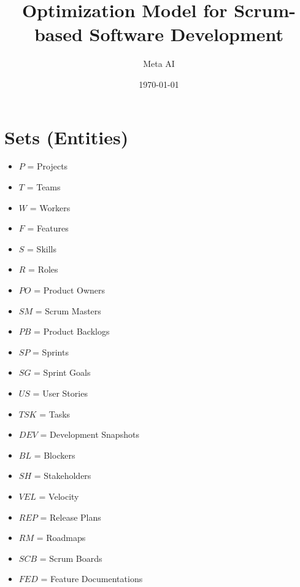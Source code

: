 \documentclass{article}
\title{Optimization Model for Scrum-based Software Development}
\author{Meta AI}
\date{\today}
\begin{document}
\maketitle
\tableofcontents

\section{Sets (Entities)}
\begin{itemize}
    \item $P$ = Projects
    \item $T$ = Teams
    \item $W$ = Workers
    \item $F$ = Features
    \item $S$ = Skills
    \item $R$ = Roles
    \item $PO$ = Product Owners
    \item $SM$ = Scrum Masters
    \item $PB$ = Product Backlogs
    \item $SP$ = Sprints
    \item $SG$ = Sprint Goals
    \item $US$ = User Stories
    \item $TSK$ = Tasks
    \item $DEV$ = Development Snapshots
    \item $BL$ = Blockers
    \item $SH$ = Stakeholders
    \item $VEL$ = Velocity
    \item $REP$ = Release Plans
    \item $RM$ = Roadmaps
    \item $SCB$ = Scrum Boards
    \item $FED$ = Feature Documentations
\end{itemize}
\end{document}

